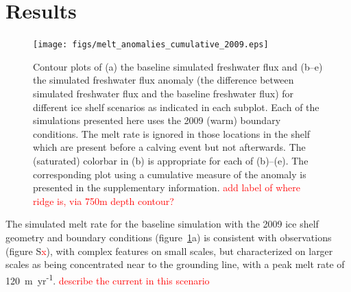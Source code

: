 \documentclass[draft]{agujournal2019}
\newcommand{\red}[1]{\textcolor{red}{#1}}
\begin{document}
        


\section{Results}
\begin{figure}
    \centering
    \texttt{[image: figs/melt\_anomalies\_cumulative\_2009.eps]}
    \caption{Contour plots of (a) the baseline simulated freshwater flux and (b--e) the simulated freshwater flux anomaly (the difference between simulated freshwater flux and the baseline freshwater flux) for different ice shelf scenarios as indicated in each subplot. Each of the simulations presented here uses the 2009 (warm) boundary conditions. The melt rate is ignored in those locations in the shelf which are present before a calving event but not afterwards. The (saturated) colorbar in (b) is appropriate for each of (b)--(e). The corresponding plot using a cumulative measure of the anomaly is presented in the supplementary information. \red{add label of where ridge is, via 750m depth contour?} }
    \label{fig:melt_anomalies_cumulaties_2009}
\end{figure}

The simulated melt rate for the baseline simulation with the 2009 ice shelf geometry and boundary conditions (figure~\ref{fig:melt_anomalies_cumulaties_2009}a) is consistent with observations (figure S\red{x}), with complex features on small scales, but characterized on larger scales as being concentrated near to the grounding line, with a peak melt rate of 120~m~yr\textsuperscript{-1}. \red{describe the current in this scenario}
\end{document}
